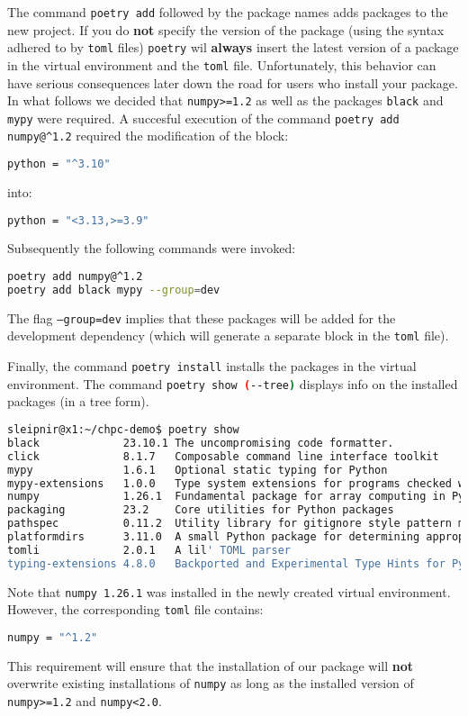 \documentclass[10pt]{article}
\begin{document}
The command \lstinline[language=bash]{poetry add} followed by the package names adds packages to the new project. 
If you do \textbf{not} specify the version of the package (using the syntax adhered to by \texttt{toml} files) 
\lstinline[language=bash]{poetry} wil \textbf{always} insert 
the latest version of a package in the virtual environment and the \texttt{toml} file. Unfortunately,
this behavior can have serious consequences later down the road for users who install your package. 
In what follows we decided that \texttt{numpy>=1.2} as well as the packages \texttt{black} and \texttt{mypy} were required.
A succesful execution of the command \texttt{poetry add numpy@\textasciicircum1.2} required the modification of the block:
\begin{lstlisting}[language=bash]
python = "^3.10"
\end{lstlisting}
into:
\begin{lstlisting}[language=bash]
python = "<3.13,>=3.9"
\end{lstlisting}
Subsequently the following commands were invoked:
\begin{lstlisting}[language=bash]
poetry add numpy@^1.2
poetry add black mypy --group=dev
\end{lstlisting}
The flag \texttt{--group=dev} implies that these packages will be added for the development dependency 
(which will generate a separate block in the \texttt{toml} file).

Finally, the command \lstinline[language=bash]{poetry install} installs the packages in the virtual environment. 
The command \lstinline[language=bash]{poetry show (--tree)} displays info on the installed packages (in a tree form).

\begin{lstlisting}[language=bash]
sleipnir@x1:~/chpc-demo$ poetry show
black             23.10.1 The uncompromising code formatter.
click             8.1.7   Composable command line interface toolkit
mypy              1.6.1   Optional static typing for Python
mypy-extensions   1.0.0   Type system extensions for programs checked with the mypy type checker.
numpy             1.26.1  Fundamental package for array computing in Python
packaging         23.2    Core utilities for Python packages
pathspec          0.11.2  Utility library for gitignore style pattern matching of file paths.
platformdirs      3.11.0  A small Python package for determining appropriate platform-specific dirs, e.g. a "user data dir".
tomli             2.0.1   A lil' TOML parser
typing-extensions 4.8.0   Backported and Experimental Type Hints for Python 3.8+
\end{lstlisting}
Note that \texttt{numpy 1.26.1} was installed in the newly created virtual environment. 
However, the corresponding \texttt{toml} file contains:
\begin{lstlisting}[language=bash]
numpy = "^1.2"
\end{lstlisting}
This requirement will ensure that the installation of our package will \textbf{not} overwrite existing 
installations of \texttt{numpy} as long as the installed version of \texttt{numpy>=1.2} and \texttt{numpy<2.0}.
\end{document}
